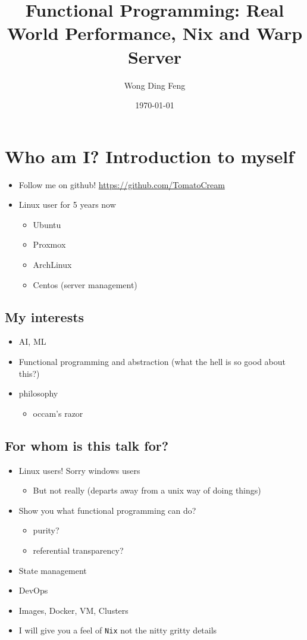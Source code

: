 \documentclass[11pt]{article}
\author{Wong Ding Feng}
\date{\today}
\title{Functional Programming: Real World Performance, Nix and Warp Server}
\begin{document}
\maketitle
\tableofcontents

\section{Who am I? Introduction to myself}
\label{sec:orgea5e087}
\begin{itemize}
\item Follow me on github!
\url{https://github.com/TomatoCream}
\item Linux user for 5 years now
\begin{itemize}
\item Ubuntu
\item Proxmox
\item ArchLinux
\item Centos (server management)
\end{itemize}
\end{itemize}
\subsection{My interests}
\label{sec:org6d42dff}
\begin{itemize}
\item AI, ML
\item Functional programming and abstraction (what the hell is so good about this?)
\item philosophy
\begin{itemize}
\item occam's razor
\end{itemize}
\end{itemize}
\subsection{For whom is this talk for?}
\label{sec:org41cfc06}
\begin{itemize}
\item Linux users! Sorry windows users
\begin{itemize}
\item But not really (departs away from a unix way of doing things)
\end{itemize}
\item Show you what functional programming can do?
\begin{itemize}
\item purity?
\item referential transparency?
\end{itemize}
\item State management
\item DevOps
\item Images, Docker, VM, Clusters
\item I will give you a feel of \texttt{Nix} not the nitty gritty details
\end{itemize}
\end{document}
